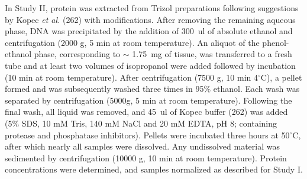 \documentclass[twoside,10pt]{gihclass} %
\begin{document}
In Study II, protein was extracted from Trizol preparations following suggestions by Kopec \emph{et al.} (262)
with modifications. After removing the remaining aqueous phase, DNA was precipitated by the addition of \SI{300}{ul} of absolute ethanol and centrifugation (2000 g, 5 min at room temperature). An aliquot of the phenol-ethanol phase, corresponding to \(\sim\) \SI{1.75}{mg} of tissue, was transferred to a fresh tube and at least two volumes of isopropanol were added followed by incubation (10 min at room temperature). After centrifugation (7500 g, 10 min 4\(^{\circ}\)C), a pellet formed and was subsequently washed three times in 95\% ethanol. Each wash was separated by centrifugation (5000g, 5 min at room temperature). Following the final wash, all liquid was removed, and \SI{45}{ul} of Kopec buffer (262) was added (5\% SDS, 10 mM Tris, 140 mM NaCl and 20 mM EDTA, pH 8; containing protease and phosphatase inhibitors).
Pellets were incubated three hours at 50\(^{\circ}\)C, after which nearly all samples were dissolved.
Any undissolved material was sedimented by centrifugation (10000 g, 10 min at room temperature).
Protein concentrations were determined, and samples normalized as described for Study I.
\end{document}

